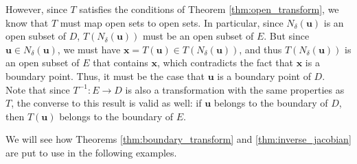 However, since $T$ satisfies the conditions of Theorem \ref{thm:open_transform}, we know that $T$ must map open sets to open sets. In particular, since $N_\delta(\mathbf{u})$ is an open subset of $D$, $T(N_\delta(\mathbf{u}))$ must be an open subset of $E$. But since $\mathbf{u}\in N_\delta(\mathbf{u})$, we must have $\mathbf{x} = T(\mathbf{u})\in T(N_\delta(\mathbf{u}))$, and thus $T(N_\delta(\mathbf{u}))$ is an open subset of $E$ that contains $\mathbf{x}$, which contradicts the fact that $\mathbf{x}$ is a boundary point. Thus, it must be the case that $\mathbf{u}$ is a boundary point of $D$.\\


Note that since $T^{-1}:E\to D$ is also a transformation with the same properties as $T$, the converse to this result is valid as well: if $\mathbf{u}$ belongs to the boundary of $D$, then $T(\mathbf{u})$ belongs to the boundary of $E$.

We will see how Theorems \ref{thm:boundary_transform} and \ref{thm:inverse_jacobian} are put to use in the following examples.\\

